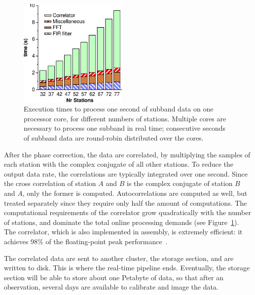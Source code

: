 \documentclass[journal]{IEEEtran}
\begin{document}
\begin{figure}
\begin{center}
\includegraphics[width=53mm]{speed.eps}
\end{center}
\caption{Execution times to process one second of subband data on one
processor core, for different numbers of stations.  Multiple cores are
necessary to process one subband in real time; consecutive seconds of subband
data are round-robin distributed over the cores.}
\label{fig:speed}
\end{figure}

After the phase correction, the data are correlated, by multiplying the
samples of each station with the complex conjugate of all other stations.
To reduce the output data rate, the correlations are typically integrated
over one second.
Since the cross correlation of station $A$ and $B$ is the complex conjugate
of station $B$ and $A$, only the former is computed.
Autocorrelations are computed as well, but treated separately since they
require only half the amount of computations.
The computational requirements of the correlator grow quadratically with the
number of stations, and dominate the total online processing demands (see
Figure~\ref{fig:speed}).
The correlator, which is also implemented in assembly, is extremely efficient:
it achieves 98\% of the floating-point peak performance~\cite{Romein:06}.

The correlated data are sent to another cluster, the storage section, and
are written to disk.
This is where the real-time pipeline ends.
Eventually, the storage section will be able to store about one Petabyte of
data, so that after an observation, several days are available to calibrate
and image the data.

\end{document}
